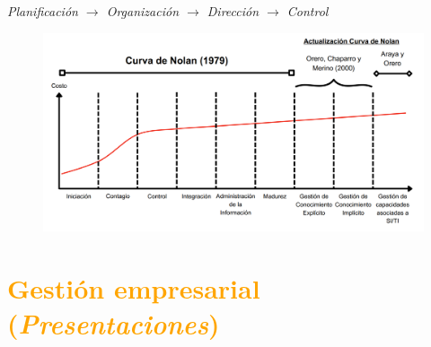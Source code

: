 \documentclass{templateNote}
\begin{document}
\begin{center}
    \textit{Planificación $\rightarrow$ Organización $\rightarrow$ Dirección $\rightarrow$ Control}
    \begin{figure}[H]
        \centering
        \vspace*{\fill}
        \includegraphics[width=1\textwidth,height=0.30\textheight,keepaspectratio]{img/CurvaDeNolanActualizada.png}
        \vspace*{\fill}
    \end{figure}
\end{center}
% 

\section{\textcolor{orange}{Gestión empresarial (\textit{Presentaciones})}}
\end{document}
